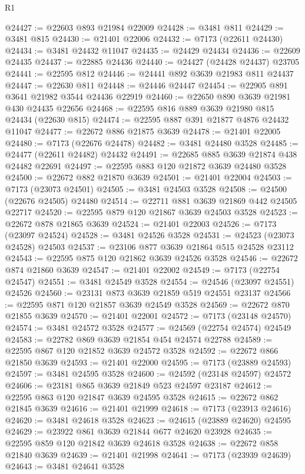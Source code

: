 \begin{lexlean}{R1}
\begin{coremodule}
@24427 := @22603 @893 @21984 @22009
@24428 := @3481 @811
@24429 := @3481 @815
@24430 := @21401 @22006
@24432 := @7173 (@22611 @24430)
@24434 := @3481 @24432 @11047
@24435 := @24429 @24434
@24436 := @22609 @24435
@24437 := @22885 @24436
@24440 := @24427 (@24428 @24437) @23705
@24441 := @22595 @812
@24446 := @24441 @892 @3639 @21983 @811 @24437
@24447 := @22630 @811
@24448 := @24446 @24447
@24454 := @22905 @891 @3641 @21982 @3544 @24436 @22919
@24460 := @22650 @890 @3639 @21981 @430 @24435 @22656
@24468 := @22595 @816 @889 @3639 @21980 @815 @24434 (@22630 @815)
@24474 := @22595 @887 @391 @21877 @4876 @24432 @11047
@24477 := @22672 @886 @21875 @3639
@24478 := @21401 @22005
@24480 := @7173 (@22676 @24478)
@24482 := @3481 @24480 @3528
@24485 := @24477 (@22611 @24482) @24432
@24491 := @22685 @885 @3639 @21874 @438 @24482 @22691
@24497 := @22595 @883 @120 @21872 @3639 @24480 @3528
@24500 := @22672 @882 @21870 @3639
@24501 := @21401 @22004
@24503 := @7173 (@23073 @24501)
@24505 := @3481 @24503 @3528
@24508 := @24500 (@22676 @24505) @24480
@24514 := @22711 @881 @3639 @21869 @442 @24505 @22717
@24520 := @22595 @879 @120 @21867 @3639 @24503 @3528
@24523 := @22672 @878 @21865 @3639
@24524 := @21401 @22003
@24526 := @7173 (@23097 @24524)
@24528 := @3481 @24526 @3528
@24531 := @24523 (@23073 @24528) @24503
@24537 := @23106 @877 @3639 @21864 @515 @24528 @23112
@24543 := @22595 @875 @120 @21862 @3639 @24526 @3528
@24546 := @22672 @874 @21860 @3639
@24547 := @21401 @22002
@24549 := @7173 (@22754 @24547)
@24551 := @3481 @24549 @3528
@24554 := @24546 (@23097 @24551) @24526
@24560 := @23131 @873 @3639 @21859 @519 @24551 @23137
@24566 := @22595 @871 @120 @21857 @3639 @24549 @3528
@24569 := @22672 @870 @21855 @3639
@24570 := @21401 @22001
@24572 := @7173 (@23148 @24570)
@24574 := @3481 @24572 @3528
@24577 := @24569 (@22754 @24574) @24549
@24583 := @22782 @869 @3639 @21854 @454 @24574 @22788
@24589 := @22595 @867 @120 @21852 @3639 @24572 @3528
@24592 := @22672 @866 @21850 @3639
@24593 := @21401 @22000
@24595 := @7173 (@23889 @24593)
@24597 := @3481 @24595 @3528
@24600 := @24592 (@23148 @24597) @24572
@24606 := @23181 @865 @3639 @21849 @523 @24597 @23187
@24612 := @22595 @863 @120 @21847 @3639 @24595 @3528
@24615 := @22672 @862 @21845 @3639
@24616 := @21401 @21999
@24618 := @7173 (@23913 @24616)
@24620 := @3481 @24618 @3528
@24623 := @24615 (@23889 @24620) @24595
@24629 := @23922 @861 @3639 @21844 @677 @24620 @23928
@24635 := @22595 @859 @120 @21842 @3639 @24618 @3528
@24638 := @22672 @858 @21840 @3639
@24639 := @21401 @21998
@24641 := @7173 (@23939 @24639)
@24643 := @3481 @24641 @3528

\end{coremodule}
\end{lexlean}
